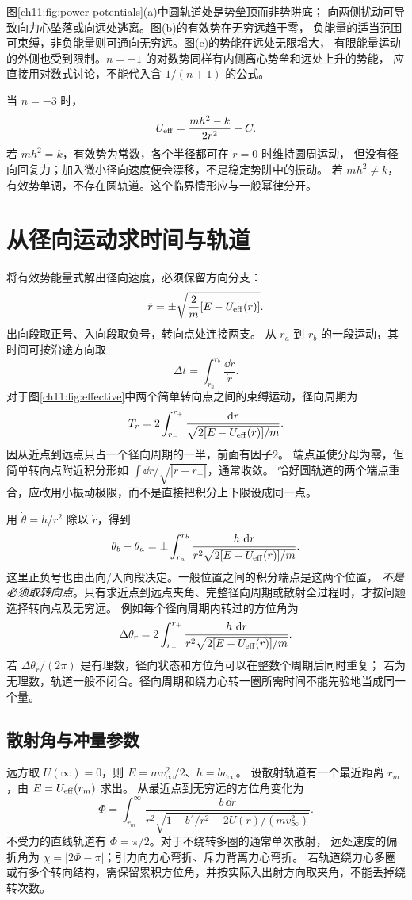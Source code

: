 图\ref{ch11:fig:power-potentials}(a)中圆轨道处是势垒顶而非势阱底；
向两侧扰动可导致向力心坠落或向远处逃离。图(b)的有效势在无穷远趋于零，
负能量的适当范围可束缚，非负能量则可通向无穷远。图(c)的势能在远处无限增大，
有限能量运动的外侧也受到限制。$n=-1$ 的对数势同样有内侧离心势垒和远处上升的势能，
应直接用对数式讨论，不能代入含 $1/(n+1)$ 的公式。

当 $n=-3$ 时，
\[
 U_{\rm eff}=\frac{mh^2-k}{2r^2}+C.
\]
若 $mh^2=k$，有效势为常数，各个半径都可在 $\dot r=0$ 时维持圆周运动，
但没有径向回复力；加入微小径向速度便会漂移，不是稳定势阱中的振动。
若 $mh^2\ne k$，有效势单调，不存在圆轨道。这个临界情形应与一般幂律分开。

\section{从径向运动求时间与轨道}
\label{ch11:sec:quadrature}
将有效势能量式解出径向速度，必须保留方向分支：
\[
 \dot r=\pm\sqrt{\frac2m[E-U_{\rm eff}(r)]}.
\]
出向段取正号、入向段取负号，转向点处连接两支。
从 $r_a$ 到 $r_b$ 的一段运动，其时间可按沿途方向取
\[
 \Delta t=\int_{r_a}^{r_b}\frac{\dd r}{\dot r}.
\]
对于图\ref{ch11:fig:effective}中两个简单转向点之间的束缚运动，径向周期为
\begin{equation}\label{ch11:eq:radial-period}
 T_r=2\int_{r_-}^{r_+}\frac{\dd r}{\sqrt{2[E-U_{\rm eff}(r)]/m}}.
\end{equation}
因从近点到远点只占一个径向周期的一半，前面有因子2。
端点虽使分母为零，但简单转向点附近积分形如 $\int\dd r/\sqrt{|r-r_\pm|}$，通常收敛。
恰好圆轨道的两个端点重合，应改用小振动极限，而不是直接把积分上下限设成同一点。

用 $\dot\theta=h/r^2$ 除以 $\dot r$，得到
\begin{equation}\label{ch11:eq:angle-integral}
 \theta_b-\theta_a=\pm\int_{r_a}^{r_b}
 \frac{h\,\dd r}{r^2\sqrt{2[E-U_{\rm eff}(r)]/m}}.
\end{equation}
这里正负号也由出向/入向段决定。一般位置之间的积分端点是这两个位置，
\emph{不是必须取转向点}。只有求近点到远点夹角、完整径向周期或散射全过程时，才按问题选择转向点及无穷远。
例如每个径向周期内转过的方位角为
\[
 \Delta\theta_r=2\int_{r_-}^{r_+}
 \frac{h\,\dd r}{r^2\sqrt{2[E-U_{\rm eff}(r)]/m}}.
\]
若 $\Delta\theta_r/(2\pi)$ 是有理数，径向状态和方位角可以在整数个周期后同时重复；
若为无理数，轨道一般不闭合。径向周期和绕力心转一圈所需时间不能先验地当成同一个量。

\subsection{散射角与冲量参数}
远方取 $U(\infty)=0$，则 $E=mv_\infty^2/2$、$h=bv_\infty$。
设散射轨道有一个最近距离 $r_m$，由 $E=U_{\rm eff}(r_m)$ 求出。
从最近点到无穷远的方位角变化为
\[
 \Phi=\int_{r_m}^{\infty}
 \frac{b\,\dd r}{r^2\sqrt{1-b^2/r^2-2U(r)/(mv_\infty^2)}}.
\]
不受力的直线轨道有 $\Phi=\pi/2$。对于不绕转多圈的通常单次散射，
远处速度的偏折角为 $\chi=|2\Phi-\pi|$；引力向力心弯折、斥力背离力心弯折。
若轨道绕力心多圈或有多个转向结构，需保留累积方位角，并按实际入出射方向取夹角，不能丢掉绕转次数。

